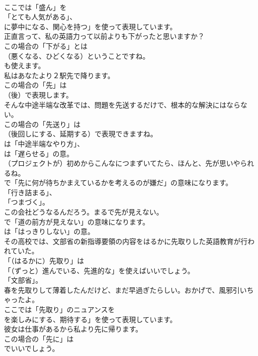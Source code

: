 \documentclass[8pt]{extreport}
\begin{document}
\begin{CJK}{UTF8}{min}
\\	ここでは「盛ん」を
\\	「とても人気がある」、
\\	に夢中になる、関心を持つ」を使って表現しています。	
\\	正直言って、私の英語力って以前よりも下がったと思いますか？ 
\\	この場合の「下がる」とは 
\\	（悪くなる、ひどくなる）ということですね。
\\	も使えます。	
\\	私はあなたより２駅先で降ります。 
\\	この場合の「先」は
\\	（後）で表現します。	
\\	そんな中途半端な改革では、問題を先送するだけで、根本的な解決にはならない。 
\\	この場合の「先送り」は
\\	（後回しにする、延期する）で表現できますね。
\\	は「中途半端なやり方」、
\\	は「遅らせる」の意。	
\\	（プロジェクトが）初めからこんなにつまずいてたら、ほんと、先が思いやられるね。 
\\	で「先に何が待ちかまえているかを考えるのが嫌だ」の意味になります。
\\	「行き詰まる」、
\\	「つまづく」。	
\\	この会社どうなるんだろう。まるで先が見えない。 
\\	で「道の前方が見えない」の意味になります。
\\	は「はっきりしない」の意。	
\\	その高校では、文部省の新指導要領の内容をはるかに先取りした英語教育が行われていた。 
\\	「（はるかに）先取り」は
\\	「（ずっと）進んでいる、先進的な」を使えばいいでしょう。
\\	「文部省」。	
\\	春を先取りして薄着したんだけど、まだ早過ぎたらしい。おかげで、風邪引いちゃったよ。 
\\	ここでは「先取り」のニュアンスを
\\	を楽しみにする、期待する」を使って表現しています。	
\\	彼女は仕事があるから私より先に帰ります。 
\\	この場合の「先に」は 
\\	でいいでしょう。	

\end{CJK}
\end{document}
